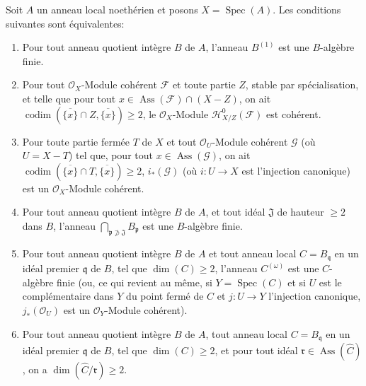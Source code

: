 \begin{proposition}[7.2.4]
\label{IV.2.s7.2.4-fr}
Soit $A$ un anneau local noethérien et posons
$X=\operatorname{Spec}(A)$. Les conditions suivantes sont équivalentes:
\begin{enumerate}
\item[a)] Pour tout anneau quotient intègre $B$ de $A$, l'anneau $B^{(1)}$
est une $B$-algèbre finie.
\item[b)] Pour tout $\mathscr O_X$-Module cohérent $\mathscr F$ et toute
partie $Z$, stable par spécialisation, et telle que pour tout
$x\in\operatorname{Ass}(\mathscr F)\cap(X-Z)$, on ait
$\operatorname{codim}(\overline{\{x\}}\cap Z,\overline{\{x\}})\geqslant2$,
le $\mathscr O_X$-Module $\mathscr H^0_{X/Z}(\mathscr F)$ est cohérent.
\item[c)] Pour toute partie fermée $T$ de $X$ et tout
$\mathscr O_U$-Module cohérent $\mathscr G$ (où $U=X-T$) tel que, pour tout
$x\in\operatorname{Ass}(\mathscr G)$, on ait
$\operatorname{codim}(\overline{\{x\}}\cap T,\overline{\{x\}})\geqslant2$,
$i_*(\mathscr G)$ (où $i:U\to X$ est l'injection canonique) est un
$\mathscr O_X$-Module cohérent.
\item[d)] Pour tout anneau quotient intègre $B$ de $A$, et tout idéal
$\mathfrak J$ de hauteur $\geqslant2$ dans $B$, l'anneau
$\displaystyle\bigcap_{\mathfrak p\not\supset\mathfrak J}B_{\mathfrak p}$
est une $B$-algèbre finie.
\item[e)] Pour tout anneau quotient intègre $B$ de $A$ et tout anneau local
$C=B_{\mathfrak q}$ en un idéal premier $\mathfrak q$ de $B$, tel que
$\dim(C)\geqslant2$, l'anneau $C^{(\omega)}$ est une $C$-algèbre finie (ou,
ce qui revient au même, si $Y=\operatorname{Spec}(C)$ et si $U$ est le
complémentaire dans $Y$ du point fermé de $C$ et $j:U\to Y$ l'injection
canonique, $j_*(\mathscr O_U)$ est un $\mathscr O_Y$-Module cohérent).
\item[f)] Pour tout anneau quotient intègre $B$ de $A$, tout anneau local
$C=B_{\mathfrak q}$ en un idéal premier $\mathfrak q$ de $B$, tel que
$\dim(C)\geqslant2$, et pour tout idéal
$\mathfrak r\in\operatorname{Ass}(\widehat C)$, on a
$\dim(\widehat C/\mathfrak r)\geqslant2$.
\end{enumerate}
\end{proposition}

